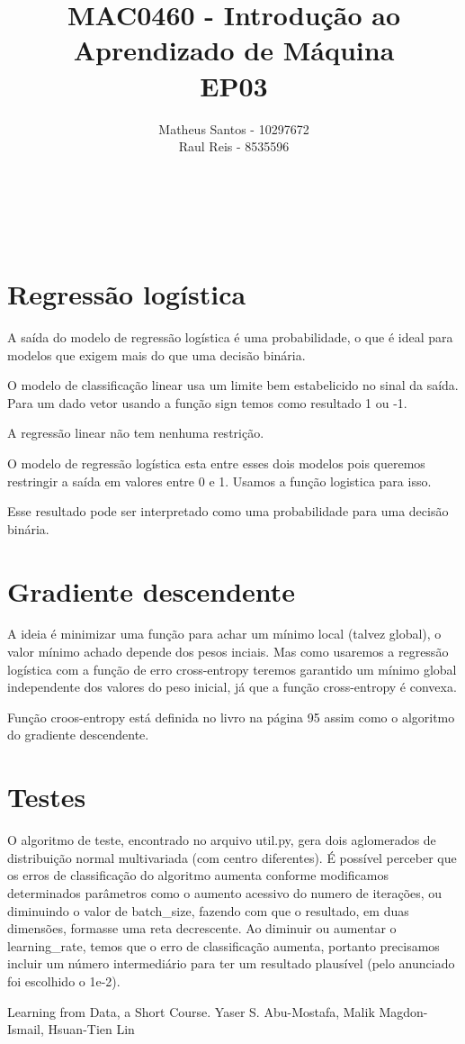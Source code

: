 \documentclass[12pt, a4paper]{article}
\title{MAC0460 - Introdução ao Aprendizado de Máquina \\ EP03}
\author{Matheus Santos - 10297672 \\
        Raul Reis - 8535596}
\begin{document}
\makeatletter
\begin{center}
	{\Large\textbf \@title \\ }
	{\Large \@author \\ }
\end{center}

\vspace{1.1cm}

\section{Regressão logística}

A saída do modelo de regressão logística é uma probabilidade, o que é
ideal para modelos que exigem mais do que uma decisão binária.

O modelo de classificação linear usa um limite bem estabelicido no sinal
da saída. Para um dado vetor usando a função sign temos como resultado 1 ou -1.

A regressão linear não tem nenhuma restrição.

O modelo de regressão logística esta entre esses dois modelos pois queremos restringir
a saída em valores entre 0 e 1. Usamos a função logistica para isso.

Esse resultado pode ser interpretado como uma probabilidade para uma decisão binária.


\section{Gradiente descendente}


A ideia é minimizar uma função para achar um mínimo local (talvez global), o valor
mínimo achado depende dos pesos inciais. Mas como usaremos a regressão logística com
a função de erro cross-entropy teremos garantido um mínimo global independente dos 
valores do peso inicial, já que a função cross-entropy é convexa.

Função croos-entropy está definida no livro na página 95 assim como o algoritmo do
gradiente descendente.

\section{Testes} 

O algoritmo de teste, encontrado no arquivo util.py, gera dois aglomerados de distribuição normal multivariada (com centro diferentes). É possível perceber que os erros de classificação do algoritmo aumenta conforme modificamos determinados parâmetros como o aumento acessivo do numero de iterações, ou diminuindo o valor de batch\_size, fazendo com que o resultado, em duas dimensões, formasse uma reta decrescente. Ao diminuir ou aumentar o learning\_rate, temos que o erro de classificação aumenta, portanto precisamos incluir um número intermediário para ter um resultado plausível (pelo anunciado foi escolhido o 1e-2). 




Learning from Data, a Short Course. Yaser S. Abu-Mostafa, Malik Magdon-Ismail, Hsuan-Tien Lin
\end{document}
